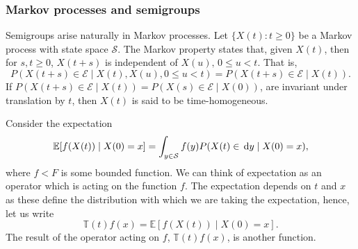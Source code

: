 \subsubsection{Markov processes and semigroups}
Semigroups arise naturally in Markov processes. Let \(\{X(t):t\geq 0\}\) be a Markov process with state space \(\mathcal S\). The Markov property states that, given \(X(t)\), then for \(s,t\geq 0\), \(X(t+s)\) is independent of \(X(u),\, 0\leq u<t\). That is, \[P(X(t+s)\in\mathcal{E} \mid X(t), X(u), 0\leq u<t)=P(X(t+s)\in\mathcal{E} \mid X(t)).\] 
If \(P(X(t+s)\in\mathcal{E} \mid X(t))=P(X(s)\in\mathcal{E} \mid X(0))\), are invariant under translation by \(t\), then \(X(t)\) is said to be time-homogeneous.


 
Consider the expectation
\[\mathbb E[f(X(t))\mid X(0)=x]=\int_{y\in\mathcal{S}} f(y) P(X(t)\in\, \mathrm{d} y\mid X(0)=x),\]
where \(f<F\) is some bounded function. We can think of expectation as an operator which is acting on the function \(f\). The expectation depends on \(t\) and \(x\) as these define the distribution with which we are taking the expectation, hence, let us write 
\[\mathbb T(t)f(x) = \mathbb E[f(X(t))\mid X(0)=x].\]
The result of the operator acting on \(f\), \(\mathbb T(t)f(x)\), is another function.

